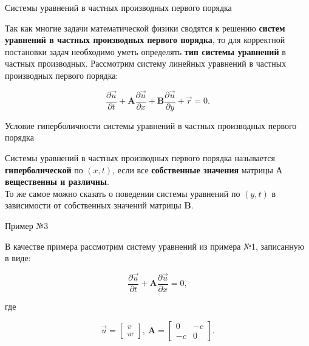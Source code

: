 \documentclass[10pt,xcolor=pst,aspectratio=169]{beamer}
\begin{document}
\begin{frame}{Системы уравнений в частных производных первого порядка}

	\transdissolve[duration=0.1]
	\justifying
	\large

	Так как многие задачи математической физики сводятся к решению \textbf{систем уравнений в частных производных первого порядка}, то для корректной постановки задач необходимо уметь определять \textbf{тип системы уравнений} в частных производных. Рассмотрим систему линейных уравнений в частных производных первого порядка:

	\[
		\frac{\partial \vec{u}}{\partial t} + \textbf{A} \frac{\partial \vec{u}}{\partial x} + \textbf{B} \frac{\partial \vec{u}}{\partial y} + \vec{r} = 0.
	\]

\end{frame}

\begin{frame}{Условие гиперболичности системы уравнений в частных производных первого порядка}

	\transdissolve[duration=0.1]
	\justifying
	\large

	Системы уравнений в частных производных первого порядка называется \textbf{гиперболической} по $(x,t)$, если все \textbf{собственные значения} матрицы $\textbf{А}$ \textbf{вещественны и различны}.\\

	То же самое можно сказать о поведении системы уравнений по $(y,t)$ в зависимости от собственных значений матрицы $\textbf{B}$.

\end{frame}

\begin{frame}{Пример №3}

	\transdissolve[duration=0.1]
	\justifying
	\large

	В качестве примера рассмотрим систему уравнений из примера №1, записанную в виде:

	\[
		\frac{\partial \vec{u}}{\partial t} + \textbf{A} \frac{\partial \vec{u}}{\partial x} = 0,
	\]

	где

	\[
		\vec{u}
		=
		\begin{bmatrix}
			v \\
			w
		\end{bmatrix}, \:
		\textbf{A}
		=
		\begin{bmatrix}
			0 & - c \\
			-c & 0
		\end{bmatrix}.
	\]

\end{frame}
\end{document}
